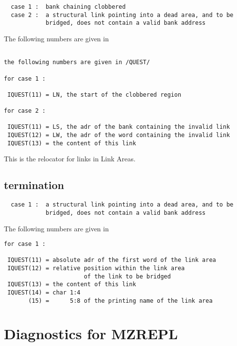 \begin{verbatim}
  case 1 :  bank chaining clobbered
  case 2 :  a structural link pointing into a dead area, and to be
            bridged, does not contain a valid bank address
\end{verbatim}

The following numbers are given in 

\begin{verbatim}

the following numbers are given in /QUEST/

for case 1 :

 IQUEST(11) = LN, the start of the clobbered region

for case 2 :

 IQUEST(11) = LS, the adr of the bank containing the invalid link
 IQUEST(12) = LW, the adr of the word containing the invalid link
 IQUEST(13) = the content of this link

\end{verbatim}


This is the relocator for links in Link Areas.

\subsection*{ termination}

\begin{verbatim}
  case 1 :  a structural link pointing into a dead area, and to be
            bridged, does not contain a valid bank address
\end{verbatim}

The following numbers are given in 

\begin{verbatim}
for case 1 :

 IQUEST(11) = absolute adr of the first word of the link area
 IQUEST(12) = relative position within the link area
                       of the link to be bridged
 IQUEST(13) = the content of this link
 IQUEST(14) = char 1:4
       (15) =      5:8 of the printing name of the link area
\end{verbatim}

\section{Diagnostics for MZREPL}


